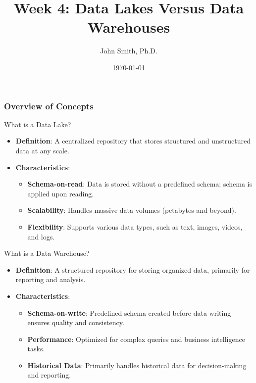 \documentclass[aspectratio=169]{beamer}
\title[Week 4: Data Lakes vs. Data Warehouses]{Week 4: Data Lakes Versus Data Warehouses}
\author[J. Smith]{John Smith, Ph.D.}
\date{\today}
\begin{document}
\frame{\titlepage}

\begin{frame}[fragile]
    \titlepage
\end{frame}

\begin{frame}[fragile]
    \frametitle{Overview of Concepts}
    
    \begin{block}{What is a Data Lake?}
        \begin{itemize}
            \item \textbf{Definition}: A centralized repository that stores structured and unstructured data at any scale.
            \item \textbf{Characteristics}:
                \begin{itemize}
                    \item \textbf{Schema-on-read}: Data is stored without a predefined schema; schema is applied upon reading.
                    \item \textbf{Scalability}: Handles massive data volumes (petabytes and beyond).
                    \item \textbf{Flexibility}: Supports various data types, such as text, images, videos, and logs.
                \end{itemize}
        \end{itemize}
    \end{block}
    
    \begin{block}{What is a Data Warehouse?}
        \begin{itemize}
            \item \textbf{Definition}: A structured repository for storing organized data, primarily for reporting and analysis.
            \item \textbf{Characteristics}:
                \begin{itemize}
                    \item \textbf{Schema-on-write}: Predefined schema created before data writing ensures quality and consistency.
                    \item \textbf{Performance}: Optimized for complex queries and business intelligence tasks.
                    \item \textbf{Historical Data}: Primarily handles historical data for decision-making and reporting.
                \end{itemize}
        \end{itemize}
    \end{block}
\end{frame}
\end{document}
